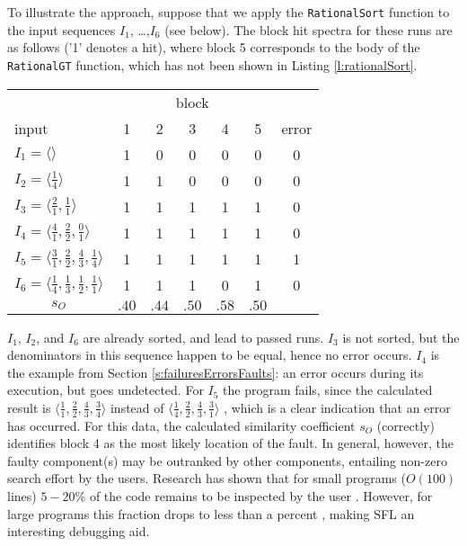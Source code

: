To illustrate the approach, suppose that we 
apply the \verb|RationalSort| function to the input sequences
$I_1$, \ldots ,$I_6$ (see below). The block hit spectra for these
runs are as follows ('1' denotes a hit), where block 5
corresponds to the body of the \verb|RationalGT| function,
which has not been shown in Listing \ref{l:rationalSort}.
\begin{center}
\begin{tabular}{l|c c c c c|c}
\multicolumn{1}{c}{} & \multicolumn{5}{c}{block} & \\
input & 1 & 2 & 3 & 4 & 5 & error \\
\hline
$I_1 = \langle \rangle$ 
& 1 & 0 & 0 & 0 & 0 & 0 \\
$I_2 = \langle \frac{1}{4} \rangle$ 
& 1 & 1 & 0 & 0 & 0 & 0 \\
$I_3 = \langle \frac{2}{1}, \frac{1}{1} \rangle$ 
& 1 & 1 & 1 & 1 & 1 & 0 \\
$I_4 = \langle \frac{4}{1}, \frac{2}{2}, \frac{0}{1} \rangle$ 
& 1 & 1 & 1 & 1 & 1 & 0 \\
$I_5 = \langle \frac{3}{1}, \frac{2}{2}, \frac{4}{3}, \frac{1}{4} \rangle$ 
& 1 & 1 & 1 & 1 & 1 & 1 \\
$I_6 = \langle \frac{1}{4}, \frac{1}{3}, \frac{1}{2}, \frac{1}{1} \rangle$ 
& 1 & 1 & 1 & 0 & 1 & 0 \\
\hline
\multicolumn{1}{c|}{$s_O$} & $.40$ & $.44$ & $.50$ & $.58$ & $.50$ & \\
\end{tabular}
\end{center}

$I_1$, $I_2$, and $I_6$ are already sorted, and lead to passed
runs. $I_3$ is not sorted, but the denominators in this
sequence happen to be equal, hence no error occurs. $I_4$
is the example from Section \ref{s:failuresErrorsFaults}: 
an error occurs during
its execution, but goes undetected. For $I_5$ the program
fails, since the calculated result is 
$\langle \frac{1}{1}, \frac{2}{2}, \frac{4}{3}, \frac{3}{4} \rangle$
instead of 
$\langle \frac{1}{4}, \frac{2}{2}, \frac{4}{3}, \frac{3}{1} \rangle$
, which is a clear indication that an error
has occurred. For this data, the calculated similarity
coefficient $s_O$ (correctly)
identifies block 4 as the most likely location of the fault.
In general, however, the faulty component(s) may be outranked
by other components, entailing non-zero search effort by the users.
Research has shown that for small programs ($O(100)$ lines) 
$5 - 20 \%$ of the code remains to be inspected by the user \cite{ZAGGECBS:07}.
However, for large programs this fraction drops to less than a percent \cite{ijcai09},
making SFL an interesting debugging aid.

